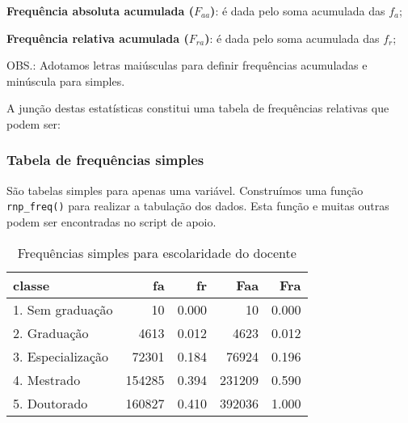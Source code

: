 \documentclass[12pt,]{style/krantz}
\makeatletter
\newenvironment{Shaded}{\begin{snugshade}}{\end{snugshade}}
\newcommand{\KeywordTok}[1]{\textcolor[rgb]{0.13,0.29,0.53}{\textbf{#1}}}
\newcommand{\DataTypeTok}[1]{\textcolor[rgb]{0.13,0.29,0.53}{#1}}
\newcommand{\DecValTok}[1]{\textcolor[rgb]{0.00,0.00,0.81}{#1}}
\newcommand{\StringTok}[1]{\textcolor[rgb]{0.31,0.60,0.02}{#1}}
\newcommand{\OtherTok}[1]{\textcolor[rgb]{0.56,0.35,0.01}{#1}}
\newcommand{\OperatorTok}[1]{\textcolor[rgb]{0.81,0.36,0.00}{\textbf{#1}}}
\newcommand{\NormalTok}[1]{#1}
\newenvironment{kframe}{%
\medskip{}
\setlength{\fboxsep}{.8em}
 \def\at@end@of@kframe{}%
 \ifinner\ifhmode%
  \def\at@end@of@kframe{\end{minipage}}%
  \begin{minipage}{\columnwidth}%
 \fi\fi%
 \def\FrameCommand##1{\hskip\@totalleftmargin \hskip-\fboxsep
 \colorbox{shadecolor}{##1}\hskip-\fboxsep
     \hskip-\linewidth \hskip-\@totalleftmargin \hskip\columnwidth}%
 \MakeFramed {\advance\hsize-\width
   \@totalleftmargin\z@ \linewidth\hsize
   \@setminipage}}%
 {\par\unskip\endMakeFramed%
 \at@end@of@kframe}
\renewenvironment{Shaded}{\begin{kframe}}{\end{kframe}}
\theoremstyle{definition}
\theoremstyle{definition}
\theoremstyle{definition}
\theoremstyle{remark}
\makeatother
\begin{document}
\textbf{Frequência absoluta acumulada (\(F_{aa}\))}: é dada pelo soma
acumulada das \(f_{a}\);

\textbf{Frequência relativa acumulada (\(F_{ra}\))}: é dada pelo soma
acumulada das \(f_{r}\);

OBS.: Adotamos letras maiúsculas para definir frequências acumuladas e
minúscula para simples.

A junção destas estatísticas constitui uma tabela de frequências
relativas que podem ser:

\subsubsection{Tabela de frequências
simples}\label{tabela-de-frequencias-simples}

São tabelas simples para apenas uma variável. Construímos uma função
\texttt{rnp\_freq()} para realizar a tabulação dos dados. Esta função e
muitas outras podem ser encontradas no script de apoio.

\begin{Shaded}
\end{Shaded}

\begin{table}[!h]

\caption{\label{tab:tab04}Frequências simples para escolaridade do docente}
\centering
\begin{tabular}{lrrrr}
\toprule
classe & fa & fr & Faa & Fra\\
\midrule
1. Sem graduação & 10 & 0.000 & 10 & 0.000\\
2. Graduação & 4613 & 0.012 & 4623 & 0.012\\
3. Especialização & 72301 & 0.184 & 76924 & 0.196\\
4. Mestrado & 154285 & 0.394 & 231209 & 0.590\\
5. Doutorado & 160827 & 0.410 & 392036 & 1.000\\
\bottomrule
\end{tabular}
\end{table}
\end{document}
